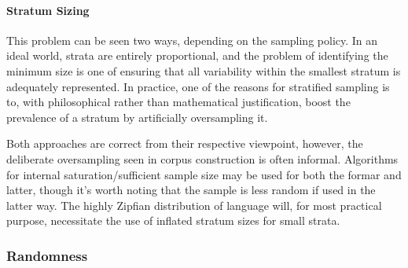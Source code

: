 




\paragraph{Stratum Sizing}
This problem can be seen two ways, depending on the sampling policy.  In an ideal world, strata are entirely proportional, and the problem of identifying the minimum size is one of ensuring that all variability within the smallest stratum is adequately represented.  In practice, one of the reasons for stratified sampling is to, with philosophical rather than mathematical justification, boost the prevalence of a stratum by artificially oversampling it.

Both approaches are correct from their respective viewpoint, however, the deliberate oversampling seen in corpus construction is often informal.  Algorithms for internal saturation/sufficient sample size may be used for both the formar and latter, though it's worth noting that the sample is less random if used in the latter way.  The highly Zipfian distribution of language will, for most practical purpose, necessitate the use of inflated stratum sizes for small strata.



\subsubsection{Randomness}


